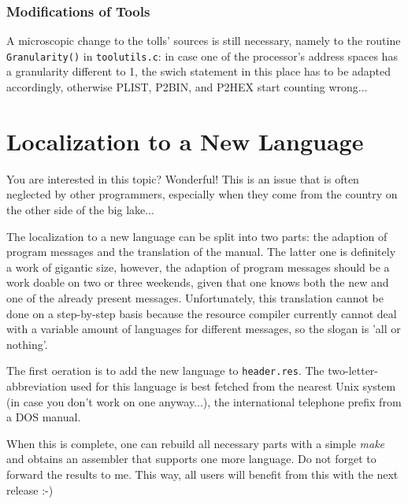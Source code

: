 \documentclass[12pt,twoside]{report}
\begin{document}
\subsubsection{Modifications of Tools}

A microscopic change to the tolls' sources is still necessary, namely to
the routine {\tt Granularity()} in {\tt toolutils.c}: in case one of the
processor's address spaces has a granularity different to 1, the swich
statement in this place has to be adapted accordingly, otherwise PLIST,
P2BIN, and P2HEX start counting wrong...

\section{Localization to a New Language}

You are interested in this topic?  Wonderful!  This is an issue that is
often neglected by other programmers, especially when they come from the
country on the other side of the big lake...

The localization to a new language can be split into two parts: the
adaption of program messages and the translation of the manual.  The
latter one is definitely a work of gigantic size, however, the adaption of
program messages should be a work doable on two or three weekends, given
that one knows both the new and one of the already present messages. 
Unfortunately, this translation cannot be done on a step-by-step basis
because the resource compiler currently cannot deal with a variable amount
of languages for different messages, so the slogan is 'all or nothing'.

The first oeration is to add the new language to {\tt header.res}.  The
two-letter-abbreviation used for this language is best fetched from the
nearest Unix system (in case you don't work on one anyway...), the
international telephone prefix from a DOS manual.

When this is complete, one can rebuild all necessary parts with a simple
{\em make} and obtains an assembler that supports one more language.  Do
not forget to forward the results to me.  This way, all users will benefit
from this with the next release :-)

\end{document}
